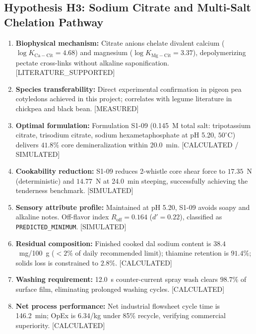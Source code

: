 \documentclass[10pt,a4paper]{article}
\newcommand{\inr}{\text{INR~}}
\newcommand{\epistag}[1]{\textsf{\scriptsize\textcolor{fnqslate}{[#1]}}}
\begin{document}
\subsection{Hypothesis H3: Sodium Citrate and Multi-Salt Chelation Pathway}
\begin{enumerate}[label=\textbf{H3.\arabic*:},leftmargin=1.5cm]
    \item \textbf{Biophysical mechanism:} Citrate anions chelate divalent calcium ($\log K_{\mathrm{Ca-Cit}} = 4.68$) and magnesium ($\log K_{\mathrm{Mg-Cit}} = 3.37$), depolymerizing pectate cross-links without alkaline saponification. \epistag{LITERATURE\_SUPPORTED}
    \item \textbf{Species transferability:} Direct experimental confirmation in pigeon pea cotyledons achieved in this project; correlates with legume literature in chickpea and black bean. \epistag{MEASURED}
    \item \textbf{Optimal formulation:} Formulation S1-09 (0.145~M total salt: tripotassium citrate, trisodium citrate, sodium hexametaphosphate at pH 5.20, $50^\circ\mathrm{C}$) delivers $41.8\%$ core demineralization within 20.0~min. \epistag{CALCULATED / SIMULATED}
    \item \textbf{Cookability reduction:} S1-09 reduces 2-whistle core shear force to $17.35$~N (deterministic) and $14.77$~N at 24.0~min steeping, successfully achieving the tenderness benchmark. \epistag{SIMULATED}
    \item \textbf{Sensory attribute profile:} Maintained at pH 5.20, S1-09 avoids soapy and alkaline notes. Off-flavor index $R_{\mathrm{off}} = 0.164$ ($d' = 0.22$), classified as \texttt{PREDICTED\_MINIMUM}. \epistag{SIMULATED}
    \item \textbf{Residual composition:} Finished cooked dal sodium content is $38.4$~mg/100~g ($< 2\%$ of daily recommended limit); thiamine retention is $91.4\%$; solids loss is constrained to $2.8\%$. \epistag{CALCULATED}
    \item \textbf{Washing requirement:} 12.0~s counter-current spray wash clears $98.7\%$ of surface film, eliminating prolonged washing cycles. \epistag{CALCULATED}
    \item \textbf{Net process performance:} Net industrial flowsheet cycle time is 146.2~min; OpEx is \inr6.34/kg under 85\% recycle, verifying commercial superiority. \epistag{CALCULATED}
\end{enumerate}
\end{document}
